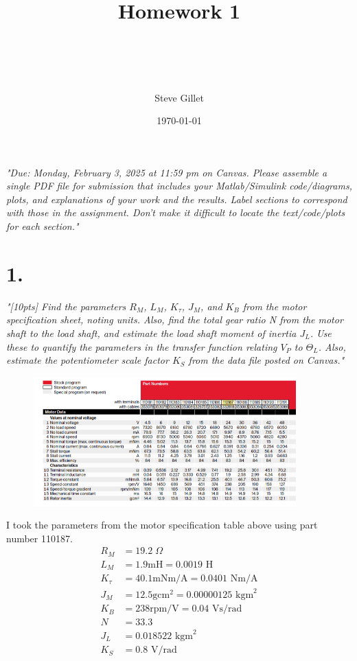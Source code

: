 \documentclass{article}
\title{Homework 1 \\ \className \\ \professorName \\ \taName}
\author{Steve Gillet}
\date{\today}
\begin{document}
\maketitle
\textit{
    "Due: Monday, February 3, 2025 at 11:59 pm on Canvas. Please assemble a single PDF file for
    submission that includes your Matlab/Simulink code/diagrams, plots, and explanations of your
    work and the results. Label sections to correspond with those in the assignment. Don’t make it
    difficult to locate the text/code/plots for each section."
}

\section*{1.}

\textit{
    "[10pts] Find the parameters $R_M$, $L_M$, $K_\tau$, $J_M$, and $K_B$ from the motor specification sheet, noting
    units. Also, find the total gear ratio N from the motor shaft to the load shaft, and estimate the
    load shaft moment of inertia $J_L$. Use these to quantify the parameters in the transfer function
    relating $V_P$ to $\Theta_L$. Also, estimate the potentiometer scale factor $K_S$ from the data file posted on Canvas."
}

\begin{figure}[H]
    \centering
    \includegraphics[width=0.9\textwidth]{motorSpec.png}
\end{figure}

I took the parameters from the motor specification table above using part number 110187.
\begin{align*}
    R_M&=19.2\;\Omega \\
    L_M&=1.9\text{mH}=0.0019\text{ H} \\
    K_\tau&=40.1\text{mNm/A}=0.0401\text{ Nm/A}  \\
    J_M&=12.5\text{gcm}^2=0.00000125\text{ kgm}^2 \\
    K_B&=238\text{rpm/V}=0.04\text{ Vs/rad} \\
    N&=33.3 \\
    J_L&=0.018522\text{ kgm}^2 \\
    K_S&=0.8\text{ V/rad}
\end{align*}
\end{document}
